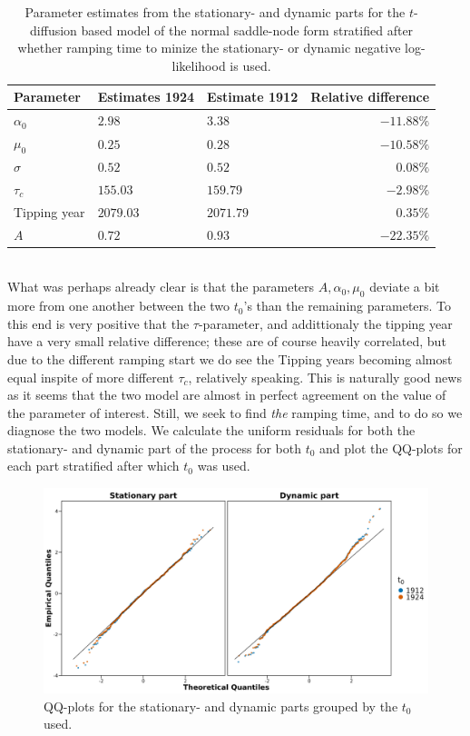 \begin{table}[h!]
    \centering
    \begin{tabular}{lllr}
     Parameter & Estimates 1924 & Estimate 1912 & Relative difference \\ \hline
    $\alpha_0$ & $2.98$ & 3$.38$ & $-11.88\%$ \\ 
      $\mu_0$ & $0.25$ & $0.28$ & $-10.58\%$ \\ 
      $\sigma$ & $0.52$ & $0.52$ & 0$.08\%$ \\ 
      $\tau_c$ & $155.03$ & $159.79$ & $-2.98\%$ \\ 
      Tipping year & $2079.03$ & $2071.79$ & $0.35\%$\\ 
      $A$ & $0.72$ & $0.93$ & $-22.35\%$ \\ 
       \hline
    \end{tabular}
    \caption{Parameter estimates from the stationary- and dynamic parts for the $t$-diffusion based model of the normal saddle-node form stratified after whether ramping time to minize the stationary- or dynamic negative log-likelihood is used.}
    \label{table:Estimates_t0_AMOC}
\end{table}\\
What was perhaps already clear is that the parameters $A, \alpha_0, \mu_0$ deviate a bit more from one another between the two $t_0$'s than the remaining parameters. To this end is very positive that the $\tau$-parameter, and addittionaly the tipping year have a very small relative difference; these are of course heavily correlated, but due to the different ramping start we do see the Tipping years becoming almost equal inspite of more different $\tau_c$, relatively speaking. This is naturally good news as it seems that the two model are almost in perfect agreement on the value of the parameter of interest. Still, we seek to find \textit{the} ramping time, and to do so we diagnose the two models. We calculate the uniform residuals for both the stationary- and dynamic part of the process for both $t_0$ and plot the QQ-plots for each part stratified after which $t_0$ was used.
\begin{figure}[h!]
    \begin{center}
        \includegraphics[scale = .09]{figures/QQ_plot_parts.jpeg}
        \caption{QQ-plots for the stationary- and dynamic parts grouped by the $t_0$ used.}
        \label{figure:AMOC_QQ_t_0}
    \end{center}
\end{figure}\\
